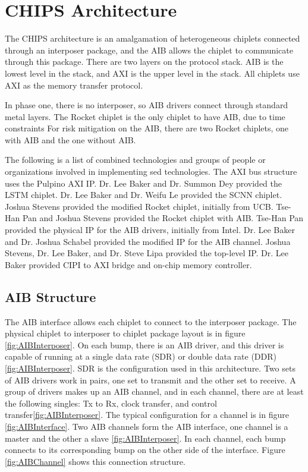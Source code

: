 \documentclass[../main.tex]{subfiles}
\begin{document}
\section{CHIPS Architecture}
The CHIPS architecture is an amalgamation of heterogeneous chiplets connected through an interposer package, and the AIB allows the chiplet to communicate through this package\cite{AIBWhitePaper}. There are two layers on the protocol stack. AIB is the lowest level in the stack, and AXI is the upper level in the stack. All chiplets use AXI as the memory transfer protocol.

In phase one, there is no interposer, so AIB drivers connect through standard metal layers. The Rocket chiplet is the only chiplet to have AIB, due to time constraints For risk mitigation on the AIB, there are two Rocket chiplets, one with AIB and the one without AIB. 

The following is a list of combined technologies and groups of people or organizations involved in implementing sed technologies. The AXI bus structure uses the Pulpino AXI IP. Dr. Lee Baker and Dr. Summon Dey provided the LSTM chiplet. Dr. Lee Baker and Dr. Weifu Le provided the SCNN chiplet. Joshua Stevens provided the modified Rocket chiplet, initially from UCB. Tse-Han Pan and Joshua Stevens provided the Rocket chiplet with AIB. Tse-Han Pan provided the physical IP for the AIB drivers, initially from Intel. Dr. Lee Baker and Dr. Joshua Schabel provided the modified IP for the AIB channel. Joshua Stevens, Dr. Lee Baker, and Dr. Steve Lipa provided the top-level IP. Dr. Lee Baker provided CIPI to AXI bridge and on-chip memory controller. 

\subsection{AIB Structure}
The AIB interface allows each chiplet to connect to the interposer package. The physical chiplet to interposer to chiplet package layout is in figure \ref{fig:AIBInterposer}. On each bump, there is an AIB driver, and this driver is capable of running at a single data rate (SDR) or double data rate (DDR)  \ref{fig:AIBInterposer}. SDR is the configuration used in this architecture. Two sets of AIB drivers work in pairs, one set to transmit and the other set to receive. A group of drivers makes up an AIB channel, and in each channel, there are at least the following singles: Tx to Rx, clock transfer, and control transfer\ref{fig:AIBInterposer}. The typical configuration for a channel is in figure \ref{fig:AIBInterface}. Two AIB channels form the AIB interface, one channel is a master and the other a slave  \ref{fig:AIBInterposer}. In each channel, each bump connects to its corresponding bump on the other side of the interface. Figure \ref{fig:AIBChannel} shows this connection structure.  
\end{document}
